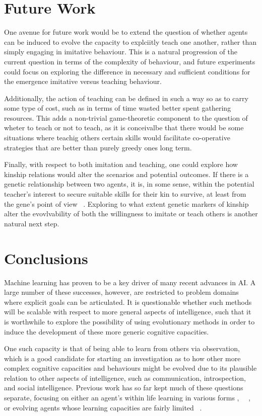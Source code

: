 \documentclass[letterpaper]{article}
\numberwithin{equation}{section}
\numberwithin{theorem}{section}
\numberwithin{lemma}{section}
\numberwithin{df}{section}
\begin{document}
\section{Future Work}

One avenue for future work would be to extend the question of whether agents can be induced to evolve the capacity to explciitly teach one another, rather than simply engaging in imitative behaviour. This is a natural progression of the current question in terms of the complexity of behaviour, and future experiments could focus on exploring the difference in necessary and sufficient conditions for the emergence imitative versus teaching behaviour.

Additionally, the action of teaching can be defined in such a way so as to carry some type of cost, such as in terms of time wasted better spent gathering resources. This adds a non-trivial game-theoretic component to the question of wheter to teach or not to teach, as it is conceivalbe that there would be some situations where teachig others certain skills would facilitate co-operative strategies that are better than purely greedy ones long term.

Finally, with respect to both imitation and teaching, one could explore how kinship relations would alter the scenarios and potential outcomes. If there is a genetic relationship between two agents, it is, in some sense, within the potential teacher's interest to secure suitable skills for their kin to survive, at least from the gene's point of view ~\cite{dawkins2006selfish}. Exploring to what extent genetic markers of kinship alter the evovlvability of both the willingness to imitate or teach others is another natural next step.

\section{Conclusions}
Machine learning has proven to be a key driver of many recent advances in AI. A large number of these successes, however, are restricted to problem domains where explicit goals can be articulated. It is questionable whether such methods will be scalable with respect to more general aspects of intelligence, such that it is worthwhile to explore the possibility of using evolutionary methods in order to induce the development of these more generic cognitive capacities.

One such capacity is that of being able to learn from others via observation, which is a good candidate for starting an investigation as to how other more complex cognitive capacities and behaviours might be evolved due to its plausible relation to other aspects of intelligence, such as communication, introspection, and social intelligence. Previous work has so far kept much of these questions separate, focusing on either an agent's within life learning in various forms \cite{bengio2009curriculum}, ~\cite{graves2017automated}~\cite{simard2017machine}, or evolving agents whose learning capacities are fairly limited ~\cite{ackley1991interactions}.
\end{document}
